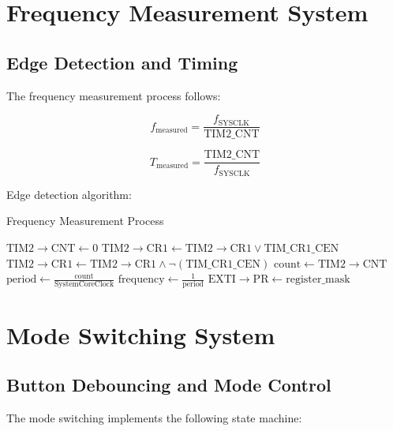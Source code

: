 \documentclass{article}
\begin{document}
\section{Frequency Measurement System}
\subsection{Edge Detection and Timing}

The frequency measurement process follows:

\begin{equation}
f_{\text{measured}} = \frac{f_{\text{SYSCLK}}}{\text{TIM2\_CNT}}
\end{equation}

\begin{equation}
T_{\text{measured}} = \frac{\text{TIM2\_CNT}}{f_{\text{SYSCLK}}}
\end{equation}

Edge detection algorithm:

\begin{algorithm}[H]
\caption{Frequency Measurement Process}
\begin{algorithmic}[1]
        \State $\text{TIM2}\rightarrow\text{CNT} \gets 0$
        \State $\text{TIM2}\rightarrow\text{CR1} \gets \text{TIM2}\rightarrow\text{CR1} \lor \text{TIM\_CR1\_CEN}$
    \Else
        \State $\text{TIM2}\rightarrow\text{CR1} \gets \text{TIM2}\rightarrow\text{CR1} \land \neg(\text{TIM\_CR1\_CEN})$
        \State $\text{count} \gets \text{TIM2}\rightarrow\text{CNT}$
        \State $\text{period} \gets \frac{\text{count}}{\text{SystemCoreClock}}$
        \State $\text{frequency} \gets \frac{1}{\text{period}}$
    \EndIf
    \State $\text{EXTI}\rightarrow\text{PR} \gets \text{register\_mask}$
\EndIf
\end{algorithmic}
\end{algorithm}

\section{Mode Switching System}
\subsection{Button Debouncing and Mode Control}

The mode switching implements the following state machine:
\end{document}
